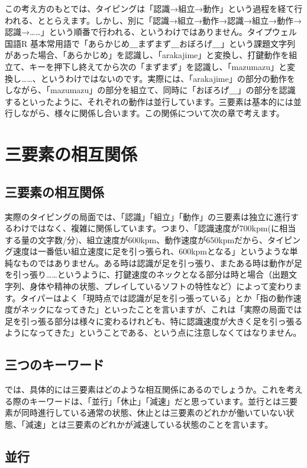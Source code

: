 この考え方のもとでは、タイピングは「認識→組立→動作」という過程を経て行われる、ととらえます。しかし、別に「認識→組立→動作→認識→組立→動作→認識→……」という順番で行われる、というわけではありません。タイプウェル国語R 基本常用語で「あらかじめ＿まずまず＿おぼろげ＿」という課題文字列があった場合、「あらかじめ」を認識し、「arakajime」と変換し、打鍵動作を組立て、キーを押下し終えてから次の「まずまず」を認識し、「mazumazu」と変換し……、というわけではないのです。実際には、「arakajime」の部分の動作をしながら、「mazumazu」の部分を組立て、同時に「おぼろげ＿」の部分を認識するといったように、それぞれの動作は並行しています。三要素は基本的には並行しながら、様々に関係し合います。この関係について次の章で考えます。

\section{三要素の相互関係}

\subsection{三要素の相互関係}

実際のタイピングの局面では、「認識」「組立」「動作」の三要素は独立に進行するわけではなく、複雑に関係しています。つまり、「認識速度が700kpm(に相当する量の文字数/分)、組立速度が600kpm、動作速度が650kpmだから、タイピング速度は一番低い組立速度に足を引っ張られ、600kpmとなる」というような単純なものではありません。ある時は認識が足を引っ張り、またある時は動作が足を引っ張り……というように、打鍵速度のネックとなる部分は時と場合（出題文字列、身体や精神の状態、プレイしているソフトの特性など）によって変わります。タイパーはよく「現時点では認識が足を引っ張っている」とか「指の動作速度がネックになってきた」といったことを言いますが、これは「実際の局面では足を引っ張る部分は様々に変わるけれども、特に認識速度が大きく足を引っ張るようになってきた」ということである、という点に注意しなくてはなりません。

\subsection{三つのキーワード}

では、具体的には三要素はどのような相互関係にあるのでしょうか。これを考える際のキーワードは、「並行」「休止」「減速」だと思っています。並行とは三要素が同時進行している通常の状態、休止とは三要素のどれかが働いていない状態、「減速」とは三要素のどれかが減速している状態のことを言います。

\subsection{並行}

